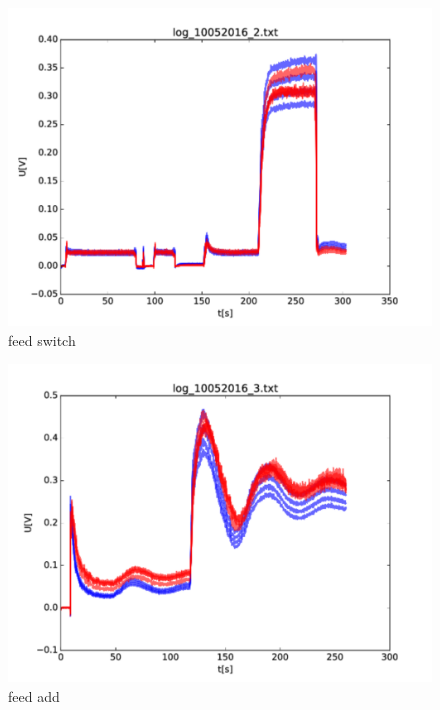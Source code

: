 \begin{figure}
	\begin{center}
		\includegraphics[width=\textwidth]{images/feed_switch.pdf} 
		\caption{feed switch}
	\end{center}
\end{figure}

\begin{figure}
	\begin{center}
		\includegraphics[width=\textwidth]{images/feed_add.pdf} 
		\caption{feed add}
	\end{center}
\end{figure}

